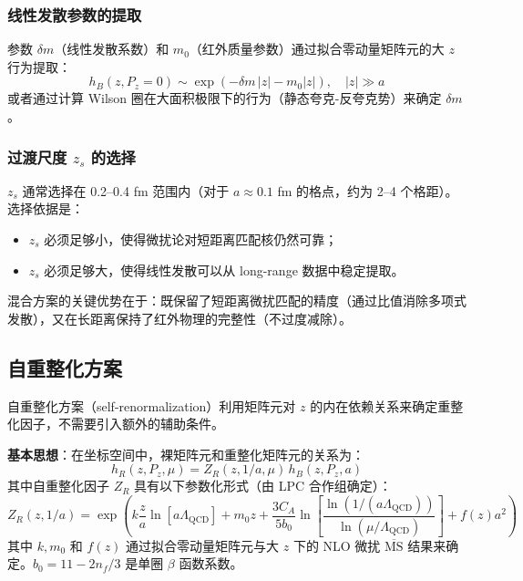 \documentclass[11pt,a4paper]{ctexart}
\begin{document}
\subsubsection{线性发散参数的提取}

参数 $\delta m$（线性发散系数）和 $m_0$（红外质量参数）通过拟合零动量矩阵元的大 $z$ 行为提取：
\begin{equation}
h_B(z, P_z=0) \sim \exp(-\delta m \, |z| - m_0 |z|), \quad |z| \gg a
\end{equation}
或者通过计算 Wilson 圈在大面积极限下的行为（静态夸克-反夸克势）来确定 $\delta m$。

\subsubsection{过渡尺度 $z_s$ 的选择}

$z_s$ 通常选择在 0.2--0.4 fm 范围内（对于 $a \approx 0.1$ fm 的格点，约为 2--4 个格距）。选择依据是：
\begin{itemize}
  \item $z_s$ 必须足够小，使得微扰论对短距离匹配核仍然可靠；
  \item $z_s$ 必须足够大，使得线性发散可以从 long-range 数据中稳定提取。
\end{itemize}

混合方案的关键优势在于：既保留了短距离微扰匹配的精度（通过比值消除多项式发散），又在长距离保持了红外物理的完整性（不过度减除）。

\subsection{自重整化方案}

自重整化方案（self-renormalization）利用矩阵元对 $z$ 的内在依赖关系来确定重整化因子，不需要引入额外的辅助条件。

\textbf{基本思想}：在坐标空间中，裸矩阵元和重整化矩阵元的关系为：
\begin{equation}
h_R(z, P_z, \mu) = Z_R(z, 1/a, \mu) \, h_B(z, P_z, a)
\end{equation}
其中自重整化因子 $Z_R$ 具有以下参数化形式（由 LPC 合作组确定）：
\begin{equation}\label{eq:self_renorm}
Z_R(z, 1/a) = \exp\!\left( k \frac{z}{a} \ln[a \Lambda_{\text{QCD}}] + m_0 z
+ \frac{3 C_A}{5 b_0} \ln\!\left[ \frac{\ln(1/(a\Lambda_{\text{QCD}}))}{\ln(\mu/\Lambda_{\text{QCD}})} \right]
+ f(z) a^2 \right)
\end{equation}
其中 $k, m_0$ 和 $f(z)$ 通过拟合零动量矩阵元与大 $z$ 下的 NLO 微扰 $\overline{\text{MS}}$ 结果来确定。$b_0 = 11 - 2n_f/3$ 是单圈 $\beta$ 函数系数。
\end{document}
